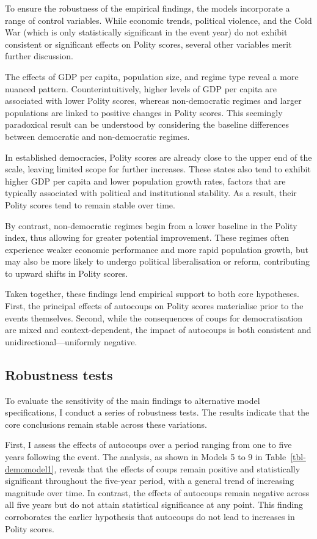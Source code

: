 \documentclass[
  12pt,
]{report}
\begin{document}
To ensure the robustness of the empirical findings, the models
incorporate a range of control variables. While economic trends,
political violence, and the Cold War (which is only statistically
significant in the event year) do not exhibit consistent or significant
effects on Polity scores, several other variables merit further
discussion.

The effects of GDP per capita, population size, and regime type reveal a
more nuanced pattern. Counterintuitively, higher levels of GDP per
capita are associated with lower Polity scores, whereas non-democratic
regimes and larger populations are linked to positive changes in Polity
scores. This seemingly paradoxical result can be understood by
considering the baseline differences between democratic and
non-democratic regimes.

In established democracies, Polity scores are already close to the upper
end of the scale, leaving limited scope for further increases. These
states also tend to exhibit higher GDP per capita and lower population
growth rates, factors that are typically associated with political and
institutional stability. As a result, their Polity scores tend to remain
stable over time.

By contrast, non-democratic regimes begin from a lower baseline in the
Polity index, thus allowing for greater potential improvement. These
regimes often experience weaker economic performance and more rapid
population growth, but may also be more likely to undergo political
liberalisation or reform, contributing to upward shifts in Polity
scores.

Taken together, these findings lend empirical support to both core
hypotheses. First, the principal effects of autocoups on Polity scores
materialise prior to the events themselves. Second, while the
consequences of coups for democratisation are mixed and
context-dependent, the impact of autocoups is both consistent and
unidirectional---uniformly negative.

\subsection{Robustness tests}\label{robustness-tests}

To evaluate the sensitivity of the main findings to alternative model
specifications, I conduct a series of robustness tests. The results
indicate that the core conclusions remain stable across these
variations.

First, I assess the effects of autocoups over a period ranging from one
to five years following the event. The analysis, as shown in Models 5 to
9 in Table~\ref{tbl-demomodel1}, reveals that the effects of coups
remain positive and statistically significant throughout the five-year
period, with a general trend of increasing magnitude over time. In
contrast, the effects of autocoups remain negative across all five years
but do not attain statistical significance at any point. This finding
corroborates the earlier hypothesis that autocoups do not lead to
increases in Polity scores.
\end{document}
